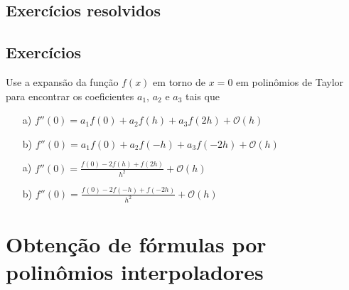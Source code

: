 \subsection*{Exercícios resolvidos}

\construirExeresol

\subsection*{Exercícios}

\construirExer

\begin{exer} Use a expansão da função $f(x)$ em torno de $x=0$ em polinômios de Taylor para encontrar os coeficientes $a_1$, $a_2$ e $a_3$ tais que
\begin{itemize}
\item[a)] $f''(0)=a_1f(0)+a_2f(h)+a_3f(2h) + \mathcal{O}(h)$
\item[b)] $f''(0)=a_1f(0)+a_2f(-h)+a_3f(-2h) + \mathcal{O}(h)$
\end{itemize}
\end{exer}
\begin{resp}
\begin{itemize}
\item[a)] $f''(0)=\frac{f(0)-2f(h)+f(2h)}{h^2}+\mathcal{O}(h)$
\item[b)] $f''(0)=\frac{f(0)-2f(-h)+f(-2h)}{h^2}+\mathcal{O}(h)$
\end{itemize}    
\end{resp}

\section{Obtenção de fórmulas por polinômios interpoladores}

